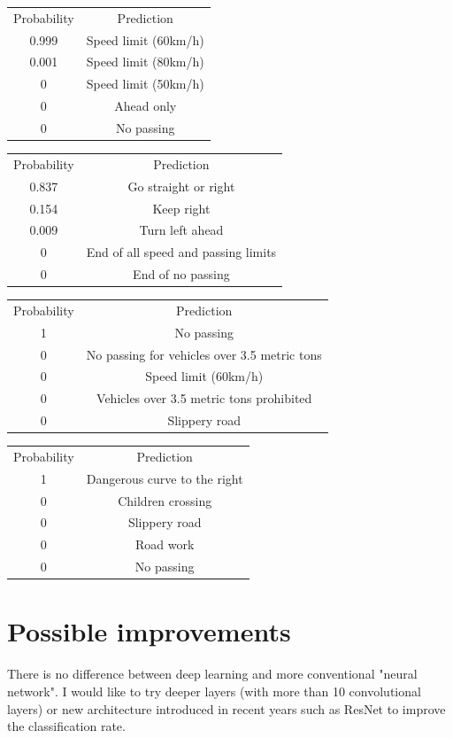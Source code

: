 \documentclass[paper=a4, fontsize=11pt]{scrartcl}
\numberwithin{equation}{section}		%
\numberwithin{figure}{section}			%
\numberwithin{table}{section}				%
\begin{document}
\begin{enumerate}
\begin{center}
\begin{tabular}{ c c }
 Probability & Prediction\\ 
0.999 & Speed limit (60km/h)\\ 
0.001 & Speed limit (80km/h)\\
0 & Speed limit (50km/h)\\
0 & Ahead only \\
0 & No passing\\
\end{tabular}
\end{center}

\begin{center}
\begin{tabular}{ c c }
 Probability & Prediction\\ 
0.837 & Go straight or right\\ 
0.154 & Keep right\\
0.009 & Turn left ahead\\
0 & End of all speed and passing limits\\
0 & End of no passing\\
\end{tabular}
\end{center}


\begin{center}
\begin{tabular}{ c c }
 Probability & Prediction\\ 
1 & No passing\\ 
0 & No passing for vehicles over 3.5 metric tons\\
0 & Speed limit (60km/h)\\
0 & Vehicles over 3.5 metric tons prohibited \\
0 & Slippery road\\
\end{tabular}
\end{center}

\begin{center}
\begin{tabular}{ c c }
 Probability & Prediction\\ 
1 & Dangerous curve to the right\\ 
0 & Children crossing\\
0 & Slippery road\\
0 & Road work\\
0 & No passing\\
\end{tabular}
\end{center}

\end{enumerate}

\section{Possible improvements}
There is no difference between deep learning and more conventional "neural network". I would like to try deeper layers (with more than 10 convolutional layers) or new architecture introduced in recent years such as ResNet to improve the classification rate.
\end{document}
